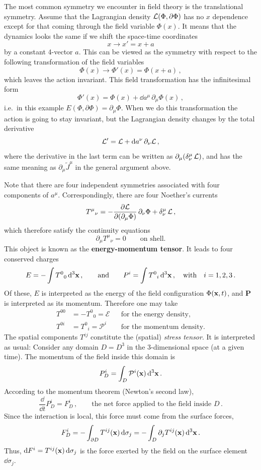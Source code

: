 The most common symmetry we encounter in field theory is the translational
symmetry. Assume that the Lagrangian density $\mathcal{L}(\Phi,\partial\Phi)$ has no
$x$ dependence except for that coming through the field variable $\Phi(x)$.
It means that the dynamics looks the same if we shift the space-time
coordinates
\[
x\to x'=x+a
\]
by a constant 4-vector $a$. This can be viewed as the symmetry with respect
to the following transformation of the field variables
\[
\Phi(x)\to\Phi'(x)=\Phi(x+a)\,,
\]
which leaves the action invariant. This field transformation has the
infinitesimal form
\[
\Phi'(x)=\Phi(x)+\dd a^\mu\,\partial_\mu\Phi(x)\,,
\]
i.e.\ in this example $E(\Phi,\partial\Phi)=\partial_\mu\Phi$. When we do
this transformation the action is going to stay invariant, but the Lagrangian
density changes by the total derivative
\[
\mathcal{L}'=\mathcal{L}+\mathop{}\!\mathrm{d} a^\nu\,\partial_\nu\mathcal{L}\,,
\]
where the derivative in the last term can be written as
$\partial_\mu(\delta^\mu_\nu\,\mathcal{L})$, and has the same meaning as
$\partial_\mu\tilde J^\mu$ in the general argument above.

Note that there are four independent symmetries associated with four
components of $a^\mu$. Correspondingly, there are four Noether's currents
\[
T^\mu{}_\nu=-\frac{\partial\mathcal{L}}{\partial(\partial_\mu\Phi)}\,\partial_\nu\Phi+\delta^\mu_\nu\,\mathcal{L}\,,
\]
which therefore satisfy the continuity equations
\[
\partial_\mu T^\mu{}_\nu=0\qquad\text{on shell.}
\]
This object is known as the \textbf{energy-momentum tensor}. It leads to four
conserved charges
\[
E=-\int T^0{}_0\mathop{}\!\mathrm{d}^3\mathbf{x}\,,
\qquad\text{and}\qquad
P^i=\int T^0{}_i\mathop{}\!\mathrm{d}^3\mathbf{x}\,,\quad\text{with}\quad i=1,2,3\,.
\]
Of these, $E$ is interpreted as the energy of the field configuration
$\Phi(\mathbf{x},t)$, and $\mathbf{P}$ is interpreted as its momentum. Therefore one
may take
\begin{align*}
T^{00}&=-T^0{}_0=\mathcal{E}&&\text{for the energy density,}\\
T^{0i}&=T^0{}_i=\mathcal{P}^i&&\text{for the momentum density.}
\end{align*}
The spatial components $T^{ij}$ constitute the (spatial) \emph{stress tensor}.
It is interpreted as usual: Consider any domain $D=D^3$ in the 3-dimensional
space (at a given time). The momentum of the field inside this domain is
\[
P^i_D=\int_D\mathcal{P}^i(\mathbf{x})\mathop{}\!\mathrm{d}^3\mathbf{x}\,.
\]
According to the momentum theorem (Newton's second law),
\[
\frac{\dd}{\dd t}P^i_D=F^i_D\,,\qquad\text{the net force applied to the field inside }D\,.
\]
Since the interaction is local, this force must come from the surface forces,
\[
F^i_D=-\int_{\partial D}T^{ij}(\mathbf{x})\mathop{}\!\mathrm{d}\sigma_j=-\int_D\partial_jT^{ij}(\mathbf{x})\mathop{}\!\mathrm{d}^3\mathbf{x}\,.
\]
Thus, $\mathop{}\!\mathrm{d} F^i=T^{ij}(\mathbf{x})\mathop{}\!\mathrm{d}\sigma_j$ is the force exerted by the field on the
surface element $\dd\sigma_j$.

